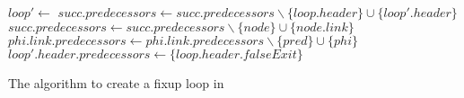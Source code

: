 \begin{algorithm}[H]
    \begin{algorithmic}
            \State $loop' \gets $ 
                    \State $succ.predecessors \gets succ.predecessors \backslash \{loop.header\} \cup \{loop'.header\}$
                \EndIf
            \EndFor
                        \State $succ.predecessors \gets succ.predecessors \backslash \{node\} \cup \{node.link\}$
                    \EndIf
                \EndFor
            \EndFor
                        \State $phi.link.predecessors \gets phi.link.predecessors \backslash \{pred\} \cup \{phi\}$
                    \EndIf
                \EndFor
            \EndFor
            \State $loop'.header.predecessors \gets \{loop.header.falseExit\}$
        \EndFunction
    \end{algorithmic}
    \caption{The algorithm to create a fixup loop in~\libFIRM}
    \label{alg:impl:fixup:loop:fixup-loop}
\end{algorithm}